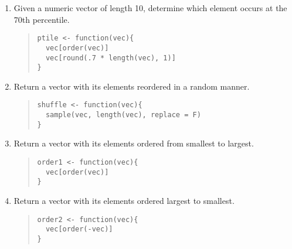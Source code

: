 \documentclass{article}
\begin{document}
\begin{enumerate}
\item Given a numeric vector of length 10, determine which element occurs at the 70th percentile.
  \begin{quote}
    \begin{verbatim}
ptile <- function(vec){
  vec[order(vec)]
  vec[round(.7 * length(vec), 1)]
}

    \end{verbatim}
  \end{quote}


\item Return a vector with its elements reordered in a random manner.
  \begin{quote}
    \begin{verbatim}
shuffle <- function(vec){
  sample(vec, length(vec), replace = F) 
}
    \end{verbatim}
  \end{quote}

\item Return a vector with its elements ordered from smallest to largest.
  \begin{quote}
    \begin{verbatim}
order1 <- function(vec){
  vec[order(vec)]
}
    \end{verbatim}
  \end{quote}

\item Return a vector with its elements ordered largest to smallest.
  \begin{quote}
    \begin{verbatim}
order2 <- function(vec){
  vec[order(-vec)]
}
    \end{verbatim}
  \end{quote}





\end{enumerate}
\end{document}
